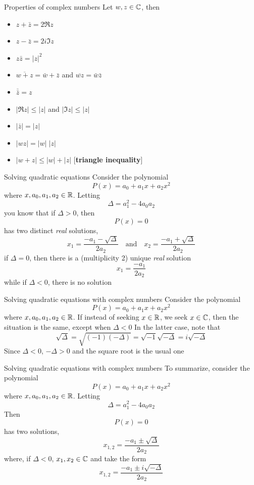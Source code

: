 \documentclass[aspectratio=169]{beamer}\usepackage[]{graphicx}\usepackage[]{xcolor}
\begin{document}
\begin{frame}{Properties of complex numbers}
	Let $w,z\in\mathbb{C}$, then
	\begin{itemize}
		\item $z+\bar z=2\Re z$
		\item $z-\bar z=2i\Im z$
		\item $z\bar z=|z|^2$
		\item $\overline{w+z}=\bar w+\bar z$ and $\overline{wz}=\bar w\bar z$
		\item $\overline{\bar z}=z$
		\item $|\Re z|\leq |z|$ and $|\Im z|\leq |z|$
		\item $|\bar z|=|z|$
		\item $|wz|=|w|\;|z|$
		\item $|w+z|\leq |w|+|z|$ \hfill[\textbf{triangle inequality}]
	\end{itemize}
\end{frame}


\begin{frame}{Solving quadratic equations}
Consider the polynomial
\[
P(x)=a_0+a_1x+a_2x^2
\]
where $x,a_0,a_1,a_2\in\mathbb{R}$. Letting
\[
\Delta = a_1^2-4a_0a_2
\]
you know that if $\Delta>0$, then 
\[
P(x)=0
\]
has two distinct \emph{real} solutions, 
\[
x_1=\frac{-a_1-\sqrt{\Delta}}{2a_2}
\quad\textrm{and}\quad
x_2=\frac{-a_1+\sqrt{\Delta}}{2a_2}
\]
if $\Delta=0$, then there is a (multiplicity 2) unique \emph{real} solution
\[
x_{1}=\frac{-a_1}{2a_2}
\]
while if $\Delta<0$, there is no solution
\end{frame}


\begin{frame}{Solving quadratic equations with complex numbers}
	Consider the polynomial
	\[
	P(x)=a_0+a_1x+a_2x^2
	\]
	where $x,a_0,a_1,a_2\in\mathbb{R}$. If instead of seeking $x\in\mathbb{R}$, we seek $x\in\mathbb{C}$, then the situation is the same, except when $\Delta<0$
	\vfill
	In the latter case, note that
	\[
	\sqrt{\Delta} 
	= \sqrt{(-1)(-\Delta)} 
	= \sqrt{-1}\sqrt{-\Delta}
	= i\sqrt{-\Delta}
	\]
	\vfill
	Since $\Delta<0$, $-\Delta>0$ and the square root is the usual one
\end{frame}

\begin{frame}{Solving quadratic equations with complex numbers}
	To summarize, consider the polynomial
	\[
	P(x)=a_0+a_1x+a_2x^2
	\]
	where $x,a_0,a_1,a_2\in\mathbb{R}$. Letting
	\[
	\Delta = a_1^2-4a_0a_2
	\]
	\vfill
	Then 
	\[
	P(x)=0
	\]
	has two solutions, 
	\[
	x_{1,2} = \frac{-a_1\pm\sqrt{\Delta}}{2a_2}
	\]
	where, if $\Delta<0$, $x_1,x_2\in\mathbb{C}$ and take the form
	\[
	x_{1,2} = \frac{-a_1\pm i\sqrt{-\Delta}}{2a_2}
	\]
\end{frame}
\end{document}
